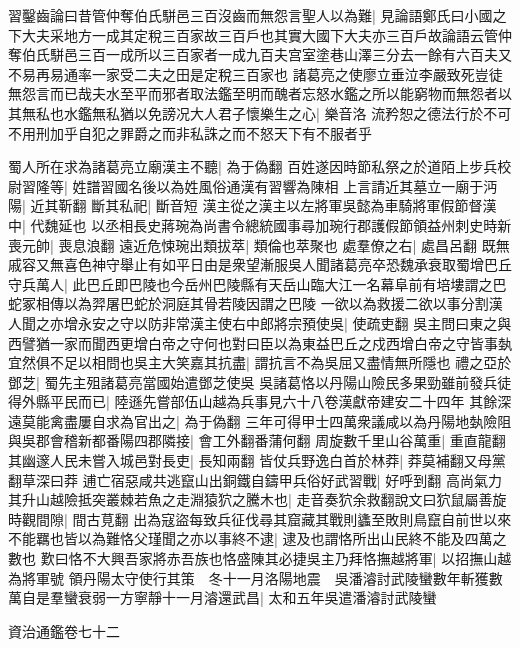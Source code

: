 習鑿齒論曰昔管仲奪伯氏駢邑三百沒齒而無怨言聖人以為難|{
	見論語鄭氏曰小國之下大夫采地方一成其定稅三百家故三百戶也其實大國下大夫亦三百戶故論語云管仲奪伯氏駢邑三百一成所以三百家者一成九百夫宫室塗巷山澤三分去一餘有六百夫又不易再易通率一家受二夫之田是定稅三百家也}
諸葛亮之使廖立垂泣李嚴致死豈徒無怨言而已哉夫水至平而邪者取法鑑至明而醜者忘怒水鑑之所以能窮物而無怨者以其無私也水鑑無私猶以免謗况大人君子懷樂生之心|{
	樂音洛}
流矜恕之德法行於不可不用刑加乎自犯之罪爵之而非私誅之而不怒天下有不服者乎

蜀人所在求為諸葛亮立廟漢主不聽|{
	為于偽翻}
百姓遂因時節私祭之於道陌上步兵校尉習隆等|{
	姓譜習國名後以為姓風俗通漢有習響為陳相}
上言請近其墓立一廟于沔陽|{
	近其靳翻}
斷其私祀|{
	斷音短}
漢主從之漢主以左將軍吳懿為車騎將軍假節督漢中|{
	代魏延也}
以丞相長史蔣琬為尚書令總統國事尋加琬行郡護假節領益州刺史時新喪元帥|{
	喪息浪翻}
遠近危悚琬出類拔萃|{
	類倫也萃聚也}
處羣僚之右|{
	處昌呂翻}
既無戚容又無喜色神守舉止有如平日由是衆望漸服吳人聞諸葛亮卒恐魏承衰取蜀增巴丘守兵萬人|{
	此巴丘即巴陵也今岳州巴陵縣有天岳山臨大江一名幕阜前有培塿謂之巴蛇冢相傳以為羿屠巴蛇於洞庭其骨若陵因謂之巴陵}
一欲以為救援二欲以事分割漢人聞之亦增永安之守以防非常漢主使右中郎將宗預使吳|{
	使疏吏翻}
吳主問曰東之與西譬猶一家而聞西更增白帝之守何也對曰臣以為東益巴丘之戍西增白帝之守皆事埶宜然俱不足以相問也吳主大笑嘉其抗盡|{
	謂抗言不為吳屈又盡情無所隱也}
禮之亞於鄧芝|{
	蜀先主殂諸葛亮當國始遣鄧芝使吳}
吳諸葛恪以丹陽山險民多果勁雖前發兵徒得外縣平民而已|{
	陸遜先嘗部伍山越為兵事見六十八卷漢獻帝建安二十四年}
其餘深遠莫能禽盡屢自求為官出之|{
	為于偽翻}
三年可得甲士四萬衆議咸以為丹陽地埶險阻與吳郡會稽新都番陽四郡隣接|{
	會工外翻番蒲何翻}
周旋數千里山谷萬重|{
	重直龍翻}
其幽邃人民未嘗入城邑對長吏|{
	長知兩翻}
皆仗兵野逸白首於林莽|{
	莽莫補翻又母黨翻草深曰莽}
逋亡宿惡咸共逃竄山出銅鐵自鑄甲兵俗好武習戰|{
	好呼到翻}
高尚氣力其升山越險抵突叢棘若魚之走淵猿狖之騰木也|{
	走音奏狖余救翻說文曰狖鼠屬善旋}
時觀間隙|{
	間古莧翻}
出為寇盜每致兵征伐尋其窟藏其戰則蠭至敗則鳥竄自前世以來不能羈也皆以為難恪父瑾聞之亦以事終不逮|{
	逮及也謂恪所出山民終不能及四萬之數也}
歎曰恪不大興吾家將赤吾族也恪盛陳其必捷吳主乃拜恪撫越將軍|{
	以招撫山越為將軍號}
領丹陽太守使行其策　冬十一月洛陽地震　吳潘濬討武陵蠻數年斬獲數萬自是羣蠻衰弱一方寧靜十一月濬還武昌|{
	太和五年吳遣潘濬討武陵蠻}


資治通鑑卷七十二
